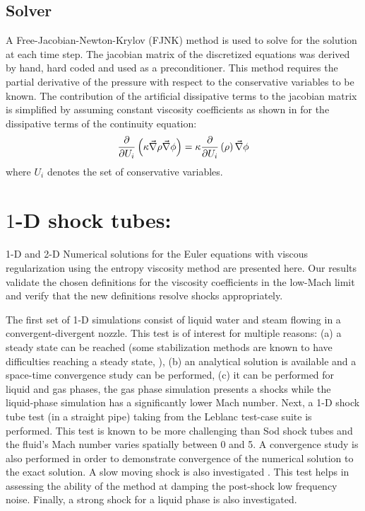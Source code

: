\subsection{Solver} \label{sec:solver}
A Free-Jacobian-Newton-Krylov (FJNK) method is used to solve for the solution at each time step. The jacobian matrix of the discretized equations was derived by hand, hard coded and used as a preconditioner. This method requires the partial derivative of the pressure with respect to the conservative variables to be known. The contribution of the artificial dissipative terms to the jacobian matrix is simplified by assuming constant viscosity coefficients as shown in  for the dissipative terms of the continuity equation:
\begin{equation}
\label{eq:jac_diss_term}
\frac{\partial}{\partial U_i} \left( \kappa \vec{\nabla} \rho \vec{\nabla} \phi \right) = \kappa \frac{\partial}{\partial U_i} \left( \rho \right) \vec{\nabla} \phi
\end{equation}  
where $U_i$ denotes the set of conservative variables.
\section{$1$-D shock tubes:} \label{sec:1d-results}
1-D and 2-D Numerical solutions for the Euler equations with viscous regularization using the entropy viscosity method are presented here.
Our results validate the chosen definitions for the viscosity coefficients in the low-Mach limit and verify that the new definitions resolve shocks appropriately. 

The first set of 1-D simulations consist of liquid water and steam flowing in a convergent-divergent nozzle. This test is of interest for multiple reasons: (a) a steady state can be reached (some stabilization methods are known to have difficulties reaching a steady state, \cite{FluxLimiter, FluxLimiter2}), (b) an analytical solution is available and a space-time convergence study can be performed, (c) it can be performed for liquid and gas phases, the gas phase simulation presents a shocks while the liquid-phase simulation has a significantly lower Mach number.
%
Next, a 1-D shock tube test (in a straight pipe) taking from the Leblanc test-case suite \cite{Leblanc} is performed. This test is known to be more challenging than Sod shock tubes and the fluid's Mach number varies spatially between 0 and 5. A convergence study is also performed in order to demonstrate convergence of the numerical solution to the exact solution. 
%
A slow moving shock is also investigated \cite{james}. This test helps in assessing the ability of the method at damping the post-shock low frequency noise. 
%
Finally, a strong shock for a liquid phase is also investigated. 

